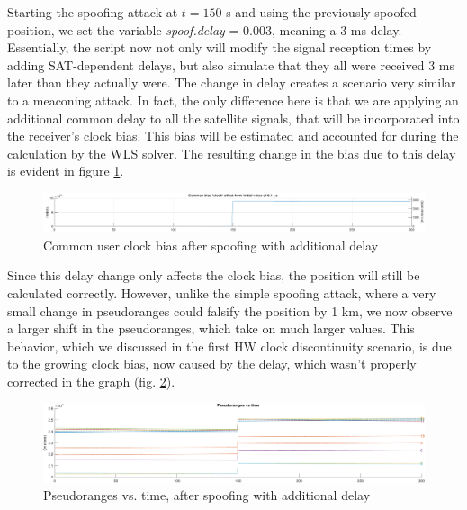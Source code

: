 Starting the spoofing attack at $t = 150$ s and using the previously spoofed position, we set the variable \textit{spoof.delay} = 0.003, meaning a 3 ms delay. Essentially, the script now not only will modify the signal reception times by adding SAT-dependent delays, but also simulate that they all were received 3 ms later than they actually were.
The change in delay creates a scenario very similar to a meaconing attack. In fact, the only difference here is that we are applying an additional common delay to all the satellite signals, that will be incorporated into the receiver's clock bias. This bias will be estimated and accounted for during the calculation by the WLS solver. The resulting change in the bias due to this delay is evident in figure \ref{fig:spoofing_clock_bias_with_delay}.
\begin{figure}[H]
    \centering
    \includegraphics[width=1.00
    \linewidth]{images/clock_bias_with_delay.pdf}
    \caption{Common user clock bias after spoofing with additional delay}
    \label{fig:spoofing_clock_bias_with_delay}
\end{figure}
Since this delay change only affects the clock bias, the position will still be calculated correctly. However, unlike the simple spoofing attack, where a very small change in pseudoranges could falsify the position by 1 km, we now observe a larger shift in the pseudoranges, which take on much larger values. This behavior, which we discussed in the first HW clock discontinuity scenario, is due to the growing clock bias, now caused by the delay, which wasn't properly corrected in the graph (fig. \ref{fig:spoofing_pseudoranges_with_delay}).
\begin{figure}[H]
    \centering
    \includegraphics[width=1.00
    \linewidth]{images/spoofing_prs_change_due_to_delay.pdf}
    \caption{Pseudoranges vs. time, after spoofing with  additional delay}
    \label{fig:spoofing_pseudoranges_with_delay}
\end{figure}